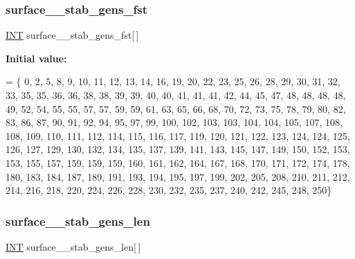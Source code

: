 \mbox{\label{surface__47_8_c_a95352939d6b094c1b37f01961004f486}} 
\subsubsection{\texorpdfstring{surface\+\_\+\_\+stab\+\_\+gens\+\_\+fst}{surface\_47\_stab\_gens\_fst}}
{\footnotesize\ttfamily \mbox{\hyperlink{galois_8h_a09fddde158a3a20bd2dcadb609de11dc}{I\+NT}} surface\+\_\+\_\+stab\+\_\+gens\+\_\+fst\mbox{[}$\,$\mbox{]}}

{\bfseries Initial value\+:}
\begin{DoxyCode}
= \{ 0, 2, 5, 8, 9, 10, 11, 12, 13, 14, 
    16, 19, 20, 22, 23, 25, 26, 28, 29, 30, 
    31, 32, 33, 35, 35, 36, 36, 38, 38, 39, 
    39, 40, 40, 41, 41, 41, 42, 44, 45, 47, 
    48, 48, 48, 48, 49, 52, 54, 55, 55, 57, 
    57, 59, 59, 61, 63, 65, 66, 68, 70, 72, 
    73, 75, 78, 79, 80, 82, 83, 86, 87, 90, 
    91, 92, 94, 95, 97, 99, 100, 102, 103, 103, 
    104, 104, 105, 107, 108, 108, 109, 110, 111, 112, 
    114, 115, 116, 117, 119, 120, 121, 122, 123, 124, 
    124, 125, 126, 127, 129, 130, 132, 134, 135, 137, 
    139, 141, 143, 145, 147, 149, 150, 152, 153, 153, 
    155, 157, 159, 159, 159, 160, 161, 162, 164, 167, 
    168, 170, 171, 172, 174, 178, 180, 183, 184, 187, 
    189, 191, 193, 194, 195, 197, 199, 202, 205, 208, 
    210, 211, 212, 214, 216, 218, 220, 224, 226, 228, 
    230, 232, 235, 237, 240, 242, 245, 248, 250\}
\end{DoxyCode}
\mbox{\label{surface__47_8_c_afbadba616cb2b501d546c5b4f22dd848}} 
\subsubsection{\texorpdfstring{surface\+\_\+\_\+stab\+\_\+gens\+\_\+len}{surface\_47\_stab\_gens\_len}}
{\footnotesize\ttfamily \mbox{\hyperlink{galois_8h_a09fddde158a3a20bd2dcadb609de11dc}{I\+NT}} surface\+\_\+\_\+stab\+\_\+gens\+\_\+len\mbox{[}$\,$\mbox{]}}

